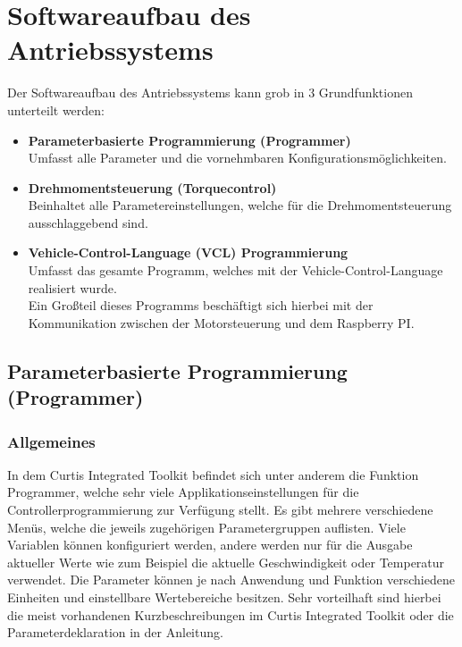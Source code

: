 \newpage


\section{Softwareaufbau des Antriebssystems}
Der Softwareaufbau des Antriebssystems kann grob in 3 Grundfunktionen unterteilt werden:
\\[5mm]
\begin{itemize}
	\item \textbf{Parameterbasierte Programmierung (Programmer)}
	\\ \medskip Umfasst alle Parameter und die vornehmbaren Konfigurationsmöglichkeiten.
	\medskip
	\item \textbf{Drehmomentsteuerung (Torquecontrol)}
	\\ \medskip Beinhaltet alle Parametereinstellungen, welche für die Drehmomentsteuerung ausschlaggebend sind.
	\medskip
	\item \textbf{Vehicle-Control-Language (VCL) Programmierung}
	\\ \medskip Umfasst das gesamte Programm, welches mit der Vehicle-Control-Language realisiert wurde.
	\\ Ein Großteil dieses Programms beschäftigt sich hierbei mit der Kommunikation zwischen der Motorsteuerung und dem Raspberry PI.
\end{itemize}

\newpage

\subsection{Parameterbasierte Programmierung (Programmer)}
\subsubsection{Allgemeines}
In dem Curtis Integrated Toolkit befindet sich unter anderem die Funktion \glqq Programmer\grqq{}, welche sehr viele Applikationseinstellungen für die Controllerprogrammierung zur Verfügung stellt. Es gibt mehrere verschiedene Menüs, welche die jeweils zugehörigen Parametergruppen auflisten. Viele Variablen können konfiguriert werden, andere werden nur für die Ausgabe aktueller Werte wie zum Beispiel die aktuelle Geschwindigkeit oder Temperatur verwendet. Die Parameter können je nach Anwendung und Funktion verschiedene Einheiten und einstellbare Wertebereiche besitzen. Sehr vorteilhaft sind hierbei die meist vorhandenen Kurzbeschreibungen im Curtis Integrated Toolkit oder die Parameterdeklaration in der Anleitung.

